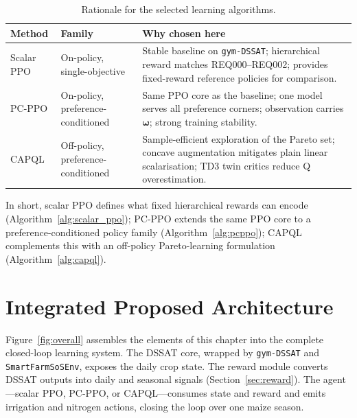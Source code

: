 \begin{table}[ht]
\centering
\caption{Rationale for the selected learning algorithms.}
\label{tab:algos}
\small
\renewcommand{\arraystretch}{1.3}
\begin{tabular}{>{\raggedright\arraybackslash}p{2.8cm}
                >{\raggedright\arraybackslash}p{2.6cm}
                >{\raggedright\arraybackslash}p{6.3cm}}
\toprule
\textbf{Method} & \textbf{Family} & \textbf{Why chosen here} \\
\midrule
Scalar PPO & On-policy, single-objective &
Stable baseline on \texttt{gym-DSSAT}; hierarchical reward matches REQ000--REQ002;
provides fixed-reward reference policies for comparison. \\
PC-PPO & On-policy, preference-conditioned &
Same PPO core as the baseline; one model serves all preference corners;
observation carries $\boldsymbol{\omega}$; strong training stability. \\
CAPQL & Off-policy, preference-conditioned &
Sample-efficient exploration of the Pareto set; concave augmentation mitigates
plain linear scalarisation; TD3 twin critics reduce Q overestimation. \\
\bottomrule
\end{tabular}
\end{table}

In short, scalar PPO defines what fixed hierarchical rewards can encode
(Algorithm~\ref{alg:scalar_ppo}); PC-PPO extends the same PPO core to a
preference-conditioned policy family (Algorithm~\ref{alg:pcppo}); CAPQL
complements this with an off-policy Pareto-learning formulation
(Algorithm~\ref{alg:capql}).


\section{Integrated Proposed Architecture}
\label{sec:overall}

Figure~\ref{fig:overall} assembles the elements of this chapter into the complete
closed-loop learning system. The DSSAT core, wrapped by \texttt{gym-DSSAT} and
\texttt{SmartFarmSoSEnv}, exposes the daily crop state. The reward module
converts DSSAT outputs into daily and seasonal signals (Section~\ref{sec:reward}).
The agent---scalar PPO, PC-PPO, or CAPQL---consumes state and reward and emits
irrigation and nitrogen actions, closing the loop over one maize season.

